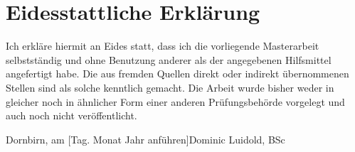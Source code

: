 \documentclass[a4paper,12pt,twoside]{scrreprt}
\begin{document}
\cleardoublepage
\chapter*{Eidesstattliche Erklärung}

Ich erkläre hiermit an Eides statt, dass ich die vorliegende Masterarbeit selbstständig und ohne Benutzung anderer als der angegebenen Hilfsmittel angefertigt habe. Die aus fremden Quellen direkt oder indirekt übernommenen Stellen sind als solche kenntlich gemacht. Die Arbeit wurde bisher weder in gleicher noch in ähnlicher Form einer anderen Prüfungsbehörde vorgelegt und auch noch nicht veröffentlicht.

\vspace{5cm}
\noindent
Dornbirn, am [Tag. Monat Jahr anführen]\hfill Dominic Luidold, BSc
\end{document}
